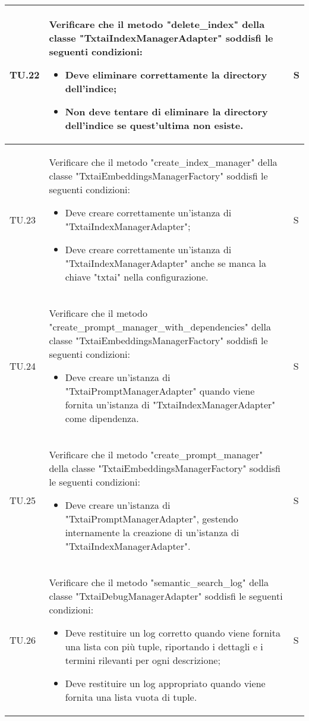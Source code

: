 \begin{adjustwidth}{-0.5cm}{-0.5cm}
\begin{longtable}{|P{1.5cm}|>{\raggedright}P{9.5cm}|>{\arraybackslash}P{1.5cm}|}
		\hline TU.22 & Verificare che il metodo "delete\_index" della classe "TxtaiIndexManagerAdapter" soddisfi le seguenti condizioni:
		\begin{itemize}
			\item Deve eliminare correttamente la directory dell'indice;
			\item Non deve tentare di eliminare la directory dell'indice se quest'ultima non esiste.
		\end{itemize} & S \\

		\hline TU.23 & Verificare che il metodo "create\_index\_manager" della classe "TxtaiEmbeddingsManagerFactory" soddisfi le seguenti condizioni:
		\begin{itemize}
			\item Deve creare correttamente un'istanza di "TxtaiIndexManagerAdapter";
			\item Deve creare correttamente un'istanza di "TxtaiIndexManagerAdapter" anche se manca la chiave "txtai" nella configurazione.
		\end{itemize} & S \\

		\hline TU.24 & Verificare che il metodo "create\_prompt\_manager\_with\_dependencies" della classe "TxtaiEmbeddingsManagerFactory" soddisfi le seguenti condizioni:
		\begin{itemize}
			\item Deve creare un'istanza di "TxtaiPromptManagerAdapter" quando viene fornita un'istanza di "TxtaiIndexManagerAdapter" come dipendenza.
		\end{itemize} & S \\

		\hline TU.25 & Verificare che il metodo "create\_prompt\_manager" della classe "TxtaiEmbeddingsManagerFactory" soddisfi le seguenti condizioni:
		\begin{itemize}
			\item Deve creare un'istanza di "TxtaiPromptManagerAdapter", gestendo internamente la creazione di un'istanza di "TxtaiIndexManagerAdapter".
		\end{itemize} & S \\

		\hline TU.26 & Verificare che il metodo "semantic\_search\_log" della classe "TxtaiDebugManagerAdapter" soddisfi le seguenti condizioni:
		\begin{itemize}
			\item Deve restituire un log corretto quando viene fornita una lista con più tuple, riportando i dettagli e i termini rilevanti per ogni descrizione;
			\item Deve restituire un log appropriato quando viene fornita una lista vuota di tuple.
		\end{itemize} & S \\


\end{longtable}
\end{adjustwidth}

